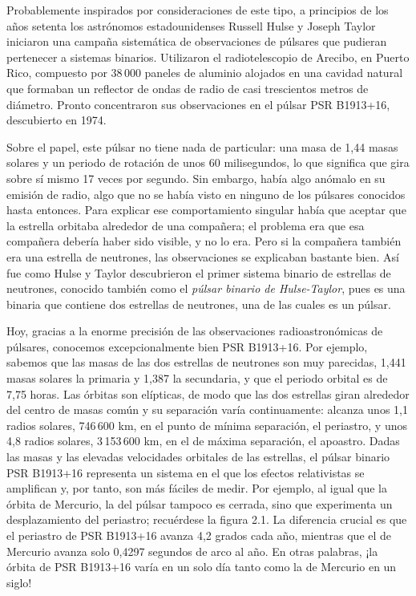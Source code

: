 Probablemente inspirados por consideraciones de este tipo, a principios de los años setenta los astrónomos estadounidenses Russell Hulse y Joseph Taylor iniciaron una campaña sistemática de observaciones de púlsares que pudieran pertenecer a sistemas binarios. Utilizaron el radiotelescopio de Arecibo, en Puerto Rico, compuesto por 38\,000 paneles de aluminio alojados en una cavidad natural que formaban un reflector de ondas de radio de casi trescientos metros de diámetro. Pronto concentraron sus observaciones en el púlsar PSR B1913+16, descubierto en 1974.

Sobre el papel, este púlsar no tiene nada de particular: una masa de 1,44 masas solares y un periodo de rotación de unos 60 milisegundos, lo que significa que gira sobre sí mismo 17 veces por segundo. Sin embargo, había algo anómalo en su emisión de radio, algo que no se había visto en ninguno de los púlsares conocidos hasta entonces. Para explicar ese comportamiento singular había que aceptar que la estrella orbitaba alrededor de una compañera; el problema era que esa compañera debería haber sido visible, y no lo era. Pero si la compañera también era una estrella de neutrones, las observaciones se explicaban bastante bien. Así fue como Hulse y Taylor descubrieron el primer sistema binario de estrellas de neutrones, conocido también como el \emph{púlsar binario de Hulse-Taylor}, pues es una binaria que contiene dos estrellas de neutrones, una de las cuales es un púlsar.

Hoy, gracias a la enorme precisión de las observaciones radioastronómicas de púlsares, conocemos excepcionalmente bien PSR B1913+16. Por ejemplo, sabemos que las masas de las dos estrellas de neutrones son muy parecidas, 1,441 masas solares la primaria y 1,387 la secundaria, y que el periodo orbital es de 7,75 horas. Las órbitas son elípticas, de modo que las dos estrellas giran alrededor del centro de masas común y su separación varía continuamente: alcanza unos 1,1 radios solares, 746\,600 km, en el punto de mínima separación, el periastro, y unos 4,8 radios solares, 3\,153\,600 km, en el de máxima separación, el apoastro. Dadas las masas y las elevadas velocidades orbitales de las estrellas, el púlsar binario PSR B1913+16 representa un sistema en el que los efectos relativistas se amplifican y, por tanto, son más fáciles de medir. Por ejemplo, al igual que la órbita de Mercurio, la del púlsar tampoco es cerrada, sino que experimenta un desplazamiento del periastro; recuérdese la figura 2.1. La diferencia crucial es que el periastro de PSR B1913+16 avanza 4,2 grados cada año, mientras que el de Mercurio avanza solo 0,4297 segundos de arco al año. En otras palabras, ¡la órbita de PSR B1913+16 varía en un solo día tanto como la de Mercurio en un siglo!

